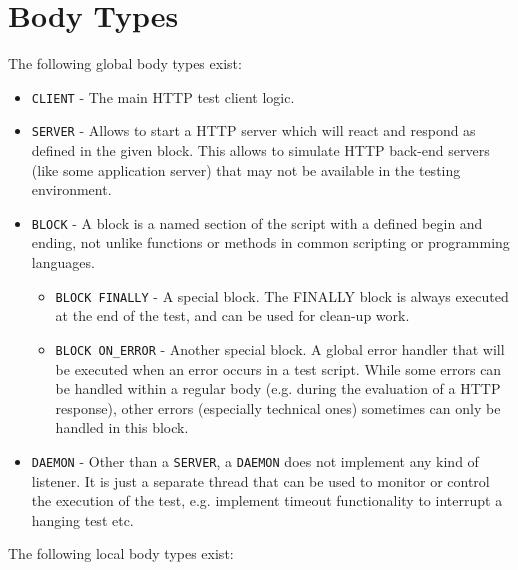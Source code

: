 \chapter{Body Types}
\label{chap:bodytypes}

The following global body types exist:

\begin{itemize}
\item \texttt{CLIENT} - The main HTTP test client logic.
 
\item \texttt{SERVER} - Allows to start a HTTP server which will react and respond as defined in the 
 given block. This allows to simulate HTTP back-end servers (like some application server)
 that may not be available in the testing environment.
 
\item \texttt{BLOCK} - A block is a named section of the script with a defined begin and ending, not 
 unlike functions or methods in common scripting or programming languages. 

  \begin{itemize}
    \item \texttt{BLOCK FINALLY} - A special block. The FINALLY block is always executed at the end of
    the test, and can be used for clean-up work.
    \item \texttt{BLOCK ON\_ERROR} - Another special block. A global error handler that will be executed 
    when an error occurs in a test script. While some errors can be handled within a regular body (e.g. during 
    the evaluation of a HTTP response), other errors (especially technical ones) sometimes can only be 
    handled in this block.
  \end{itemize}
  
\item \texttt{DAEMON} - Other than a \texttt{SERVER}, a \texttt{DAEMON} does not implement any kind of listener. It is just 
a separate thread that can be used to monitor or control the execution of the test, e.g. implement timeout 
functionality to interrupt a hanging test etc.

\end{itemize}


The following local body types exist:

